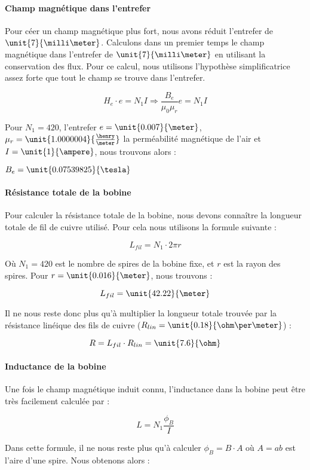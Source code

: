 \paragraph{Champ magnétique dans l'entrefer}
Pour céer un champ magnétique plus fort, nous avons réduit l'entrefer de $\unit{7}{\milli\meter}$.
Calculons dans un premier temps le champ magnétique dans l'entrefer de $\unit{7}{\milli\meter}$ en 
utilisant la conservation des flux. Pour ce calcul, nous utilisons l'hypothèse simplificatrice
assez forte que tout le champ se trouve dans l'entrefer.

$$H_e \cdot e = N_1 I \Rightarrow \frac{B_e}{\mu_0 \mu_r} e = N_1 I$$

Pour $N_1 = 420$, l'entrefer $e = \unit{0.007}{\meter}$, $\mu_r = \unit{1.0000004}{\frac{\henry}{\meter}}$ la perméabilité magnétique
de l'air et $I = \unit{1}{\ampere}$, nous trouvons alors :

$B_e = \unit{0.07539825}{\tesla}$

\paragraph{Résistance totale de la bobine}
Pour calculer la résistance totale de la bobine, nous devons connaître la longueur totale de fil de cuivre utilisé.
Pour cela nous utilisons la formule suivante :

$$L_{fil} = N_1 \cdot 2\pi r$$  

Où $N_1 = 420$ est le nombre de spires de la bobine fixe, et $r$ est la rayon des spires. Pour
$r = \unit{0.016}{\meter}$, nous trouvons :

$$L_{fil} = \unit{42.22}{\meter}$$

Il ne nous reste donc plus qu'à multiplier la longueur totale trouvée par la résistance linéique des fils de cuivre
($R_{lin} = \unit{0.18}{\ohm\per\meter}$) :

$$R = L_{fil} \cdot R_{lin} = \unit{7.6}{\ohm}$$

\paragraph{Inductance de la bobine}
Une fois le champ magnétique induit connu, l'inductance dans la bobine peut être très facilement calculée par :

$$L = N_1 \frac{\phi_B}{I}$$

Dans cette formule, il ne nous reste plus qu'à calculer $\phi_B = B \cdot A$ où $A = ab$ est l'aire d'une spire.
Nous obtenons alors :

